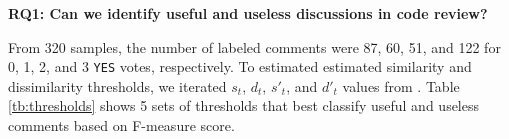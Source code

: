 \documentclass[conference]{IEEEtran}
\begin{document}
%
%
%
%
%
%
%


\noindent \textbf{RQ1: Can we identify useful and useless discussions in code review?}

From 320 samples, the number of labeled comments were 87, 60, 51, and 122 for 0, 1, 2, and 3 \texttt{YES} votes, respectively.
To estimated estimated similarity and dissimilarity thresholds, we iterated $s_t$, $d_t$, $s'_t$, and $d'_t$ values from .  Table \ref{tb:thresholds} shows 5 sets of thresholds that best classify useful and useless comments based on F-measure score.   
\end{document}
